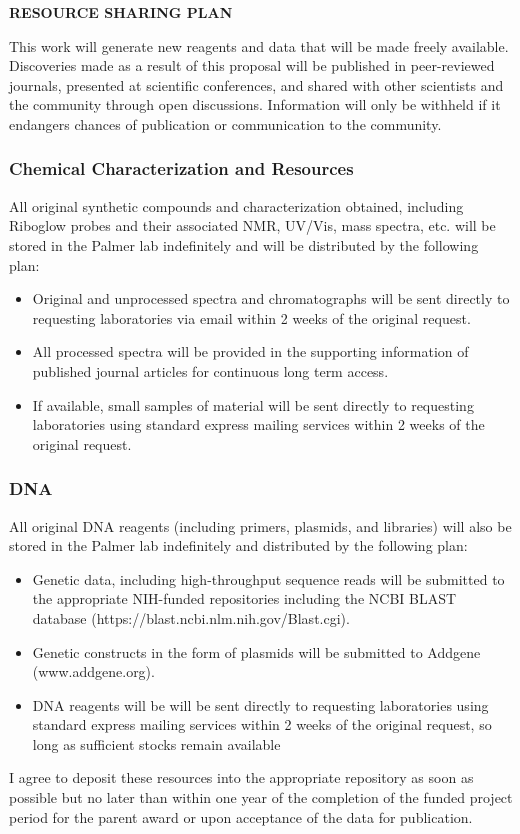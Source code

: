 \begin{center}
{\bf RESOURCE SHARING PLAN}
\end{center}

This work will generate new reagents and data that will be made freely available. Discoveries made as a result of this proposal will be published in peer-reviewed journals, presented at scientific conferences, and shared with other scientists and the community through open discussions. Information will only be withheld if it endangers chances of publication or communication to the community.

\subsubsection*{Chemical Characterization and Resources}
All original synthetic compounds and characterization obtained, including Riboglow probes and their associated NMR, UV/Vis, mass spectra, etc. will be stored in the Palmer lab indefinitely and will be distributed by the following plan:
\begin{itemize}
  \item Original and unprocessed spectra and chromatographs will be sent directly to requesting laboratories via email within 2 weeks of the original request.
  \item All processed spectra will be provided in the supporting information of published journal articles for continuous long term access.
  \item If available, small samples of material will be sent directly to requesting laboratories using standard express mailing services within 2 weeks of the original request.
\end{itemize}

\subsubsection*{DNA}
All original DNA reagents (including primers, plasmids, and libraries) will also be stored in the Palmer lab indefinitely and distributed by the following plan:
\begin{itemize}
  \item Genetic data, including high-throughput sequence reads will be submitted to the appropriate NIH-funded repositories including the NCBI BLAST database (https://blast.ncbi.nlm.nih.gov/Blast.cgi).
  \item Genetic constructs in the form of plasmids will be submitted to Addgene (www.addgene.org).
  \item DNA reagents will be will be sent directly to requesting laboratories using standard express mailing services within 2 weeks of the original request, so long as sufficient stocks remain available
\end{itemize}
I agree to deposit these resources into the appropriate repository as soon as possible but no later than within one year of the completion of the funded project period for the parent award or upon acceptance of the data for publication.

